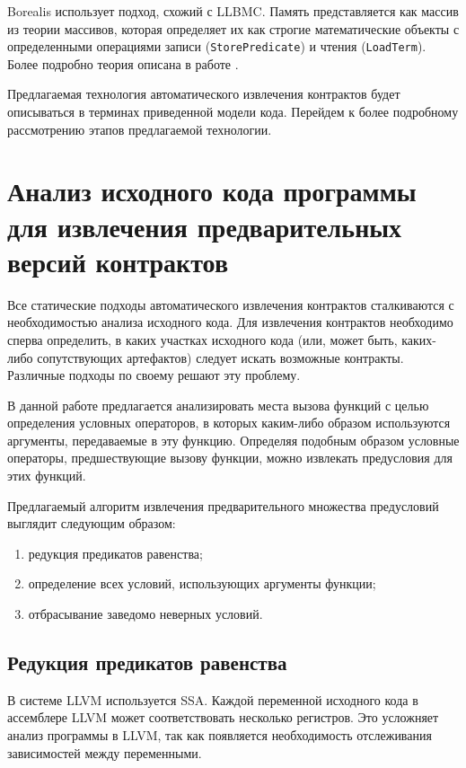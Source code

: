 Borealis использует подход, схожий с LLBMC\cite{llbmc}. Память представляется как массив из теории массивов, которая определяет их как строгие математические объекты с определенными операциями записи (\texttt{StorePredicate}) и чтения (\texttt{LoadTerm}). Более подробно теория описана в работе \cite{theoryOfArrays}.

Предлагаемая технология автоматического извлечения контрактов будет описываться в терминах приведенной модели кода. Перейдем к более подробному рассмотрению этапов предлагаемой технологии.

\section{Анализ исходного кода программы для извлечения предварительных версий контрактов}
\label{section:analysis}
Все статические подходы автоматического извлечения контрактов сталкиваются с необходимостью анализа исходного кода. Для извлечения контрактов необходимо сперва определить, в каких участках исходного кода (или, может быть, каких-либо сопутствующих артефактов) следует искать возможные контракты. Различные подходы по своему решают эту проблему.

В данной работе предлагается анализировать места вызова функций с целью определения условных операторов, в которых каким-либо образом используются аргументы, передаваемые в эту функцию. Определяя подобным образом условные операторы, предшествующие вызову функции, можно извлекать предусловия для этих функций.

Предлагаемый алгоритм извлечения предварительного множества предусловий выглядит следующим образом:
\begin{enumerate}
\item редукция предикатов равенства;
\item определение всех условий, использующих аргументы функции;
\item отбрасывание заведомо неверных условий.
\end{enumerate}

\subsection{Редукция предикатов равенства}
\label{subsection:reduction}
В системе LLVM используется SSA. Каждой переменной исходного кода в ассемблере LLVM может соответствовать несколько регистров. Это усложняет анализ программы в LLVM, так как появляется необходимость отслеживания зависимостей между переменными.

